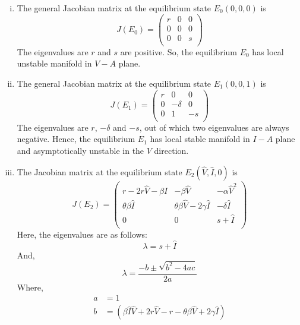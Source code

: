 \documentclass[12pt]{article}
\numberwithin{equation}{section}
\begin{document}
\begin{enumerate}[i).]
\item The general Jacobian matrix at the equilibrium state $E_0(0,0,0)$ is
\begin{equation}\label{sec3:e29}
J(E_0)=
\left({\begin{matrix}
	r & 0 & 0\\
	0 & 0 & 0\\
	0 & 0 & s\\
\end{matrix}}\right)
\end{equation}
The eigenvalues are $r$ and $s$ are positive. So, the equilibrium $E_0$ has local unstable manifold in $V-A$ plane.
\item The general Jacobian matrix at the equilibrium state $E_1(0,0,1)$ is
\begin{equation}\label{sec3:e30}
J(E_1)=
\left({\begin{matrix}
	r & 0 & 0\\
	0 & -\delta & 0\\
	0 & 1 & -s\\
\end{matrix}}\right)
\end{equation}
The eigenvalues are $r$, $-\delta$ and $-s$, out of which two eigenvalues are always negative. Hence, the equilibrium $E_1$ has local stable manifold in $I-A$ plane and asymptotically unstable in the $V$ direction.
\item The Jacobian matrix at the equilibrium state $E_2(\hat V, \hat I, 0)$ is
\begin{equation}\label{sec3:e31}
J(E_2)=
\left({\begin{matrix}
	r-2r\hat V-\beta I & -\beta \hat V & -\alpha \hat V^2\\
	\theta \beta \hat I & \theta \beta \hat V-2\gamma \hat I & -\delta \hat I\\
	0 & 0 & s+\hat I\\
\end{matrix}}\right)
\end{equation}
Here, the eigenvalues are as follows:
\begin{equation}
\lambda = s+\hat I
\end{equation}
And,
\begin{equation}
\lambda = \frac{-b \pm \sqrt{b^2 - 4ac}}{2a}
\end{equation}
Where,
\begin{align}
a &= 1\\
b &= (\beta \hat I \hat V + 2r\hat V - r -\theta \beta \hat V + 2\gamma \hat I)\\

\end{align}
\end{enumerate}
\end{document}
